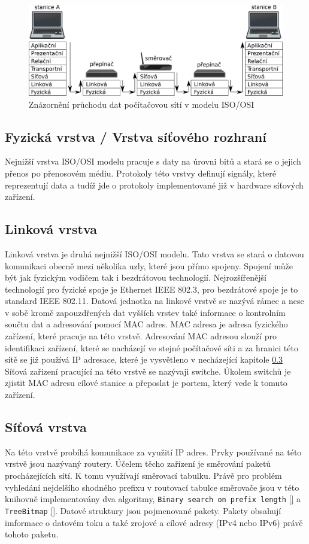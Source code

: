 \begin{figure}[!htb]
	\centering
	\includegraphics[scale=.25]{fig/layers.pdf}
	\caption{Znázornění průchodu dat počítačovou sítí v modelu ISO/OSI}
\end{figure}\label{fig:layers}

\subsection{Fyzická vrstva / Vrstva síťového rozhraní}\label{layers:physical}
Nejnižší vrstva ISO/OSI modelu pracuje s daty na úrovni bitů a stará se o
jejich přenos po přenosovém médiu. Protokoly této vrstvy definují signály, které reprezentují data
a tudíž jde o protokoly implementované již v hardware síťových zařízení.

\subsection{Linková vrstva}\label{layers:link}
Linková vrstva je druhá nejnižší ISO/OSI modelu. Tato vrstva se stará o datovou komunikaci
obecně mezi několika uzly, které jsou přímo spojeny. Spojení může být jak fyzickým vodičem tak i
bezdrátovou technologií. Nejrozšířenější technologií pro fyzické spoje je Ethernet IEEE 802.3, pro bezdrátové spoje
je to standard IEEE 802.11. Datová jednotka na linkové vrstvě se nazývá rámec a nese v sobě kromě
zapouzdřených dat vyšších vrstev také informace o kontrolním součtu dat a adresování pomocí MAC adres.
MAC adresa je adresa fyzického zařízení, které pracuje na této vrstvě.
Adresování MAC adresou slouží pro identifikaci zařízení, které se nacházejí ve stejné počítačové síti
a za hranici této sítě se již používá IP adresace, které je vysvětleno v necházející kapitole \ref{layers:network}
Síťová zařizení pracující na této vrstvě se nazývaji switche. Úkolem switchů je zjistit MAC adresu cílové stanice a přeposlat je portem, který vede k tomuto zařízení.

\subsection{Síťová vrstva}\label{layers:network}
Na této vrstvě probíhá komunikace za využití IP adres. Prvky používané na této vrstvě jsou nazývaný routery.
Účelem těcho zařízení je směrování paketů procházejících sítí. K tomu využívají směrovací tabulku.
Právě pro problém vyhledání nejdelšího shodného prefixu v routovací tabulce směrovače jsou v této knihovně
implementovány dva algoritmy, \texttt{Binary search on prefix length} \ref{} a \texttt{TreeBitmap} \ref{}.
Datové struktury jsou pojmenované pakety. Pakety obsahují imformace o datovém toku a také zrojové a cílové adresy (IPv4 nebo IPv6) právě tohoto paketu.

